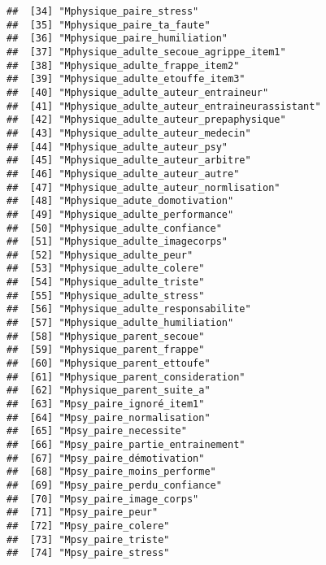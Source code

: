 \documentclass[
]{article}
\begin{document}
\begin{verbatim}
##  [34] "Mphysique_paire_stress"                              
##  [35] "Mphysique_paire_ta_faute"                            
##  [36] "Mphysique_paire_humiliation"                         
##  [37] "Mphysique_adulte_secoue_agrippe_item1"               
##  [38] "Mphysique_adulte_frappe_item2"                       
##  [39] "Mphysique_adulte_etouffe_item3"                      
##  [40] "Mphysique_adulte_auteur_entraineur"                  
##  [41] "Mphysique_adulte_auteur_entraineurassistant"         
##  [42] "Mphysique_adulte_auteur_prepaphysique"               
##  [43] "Mphysique_adulte_auteur_medecin"                     
##  [44] "Mphysique_adulte_auteur_psy"                         
##  [45] "Mphysique_adulte_auteur_arbitre"                     
##  [46] "Mphysique_adulte_auteur_autre"                       
##  [47] "Mphysique_adulte_auteur_normlisation"                
##  [48] "Mphysique_adute_domotivation"                        
##  [49] "Mphysique_adulte_performance"                        
##  [50] "Mphysique_adulte_confiance"                          
##  [51] "Mphysique_adulte_imagecorps"                         
##  [52] "Mphysique_adulte_peur"                               
##  [53] "Mphysique_adulte_colere"                             
##  [54] "Mphysique_adulte_triste"                             
##  [55] "Mphysique_adulte_stress"                             
##  [56] "Mphysique_adulte_responsabilite"                     
##  [57] "Mphysique_adulte_humiliation"                        
##  [58] "Mphysique_parent_secoue"                             
##  [59] "Mphysique_parent_frappe"                             
##  [60] "Mphysique_parent_ettoufe"                            
##  [61] "Mphysique_parent_consideration"                      
##  [62] "Mphysique_parent_suite_a"                            
##  [63] "Mpsy_paire_ignoré_item1"                             
##  [64] "Mpsy_paire_normalisation"                            
##  [65] "Mpsy_paire_necessite"                                
##  [66] "Mpsy_paire_partie_entrainement"                      
##  [67] "Mpsy_paire_démotivation"                             
##  [68] "Mpsy_paire_moins_performe"                           
##  [69] "Mpsy_paire_perdu_confiance"                          
##  [70] "Mpsy_paire_image_corps"                              
##  [71] "Mpsy_paire_peur"                                     
##  [72] "Mpsy_paire_colere"                                   
##  [73] "Mpsy_paire_triste"                                   
##  [74] "Mpsy_paire_stress"                                   

\end{verbatim}
\end{document}
